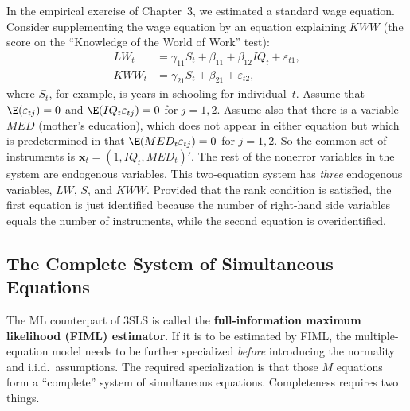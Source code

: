 \begin{example}\label{ex:8.2}
In the empirical exercise of Chapter~3,
we estimated a standard wage equation. Consider supplementing the wage
equation by an equation explaining $KWW$ (the score on the ``Knowledge of
the World of Work'' test):
\begin{align}
  LW_t &= \gamma_{11} S_t + \beta_{11} + \beta_{12} IQ_t + \varepsilon_{t1},
  \label{eq:8.5.6} \tag{8.5.6} \\
  KWW_t &= \gamma_{21} S_t + \beta_{21} + \varepsilon_{t2},
  \label{eq:8.5.7} \tag{8.5.7}
\end{align}
where $S_t$, for example, is years in schooling for individual~$t$. Assume that
$\E(\varepsilon_{tj}) = 0$ and $\E(IQ_t \varepsilon_{tj}) = 0$ for $j = 1, 2$. Assume also that there is a
variable $MED$ (mother's education), which does not appear in either equation
but which is predetermined in that $\E(MED_t \varepsilon_{tj}) = 0$ for $j = 1, 2$. So the
common set of instruments is $\mathbf{x}_t = (1, IQ_t, MED_t)'$. The rest of the nonerror
variables in the system are endogenous variables. This two-equation system
has \emph{three} endogenous variables, $LW$, $S$, and $KWW$. Provided that the rank
condition is satisfied, the first equation is just identified because the number of
right-hand side variables equals the number of instruments, while the second
equation is overidentified.
\end{example}

\subsection*{The Complete System of Simultaneous Equations}

The ML counterpart of 3SLS is called the \textbf{full-information maximum likelihood
(FIML) estimator}. If it is to be estimated by FIML, the multiple-equation model
needs to be further specialized \emph{before} introducing the normality and i.i.d.\ assumptions. The required specialization is that those $M$ equations form a ``complete''
system of simultaneous equations. Completeness requires two things.

